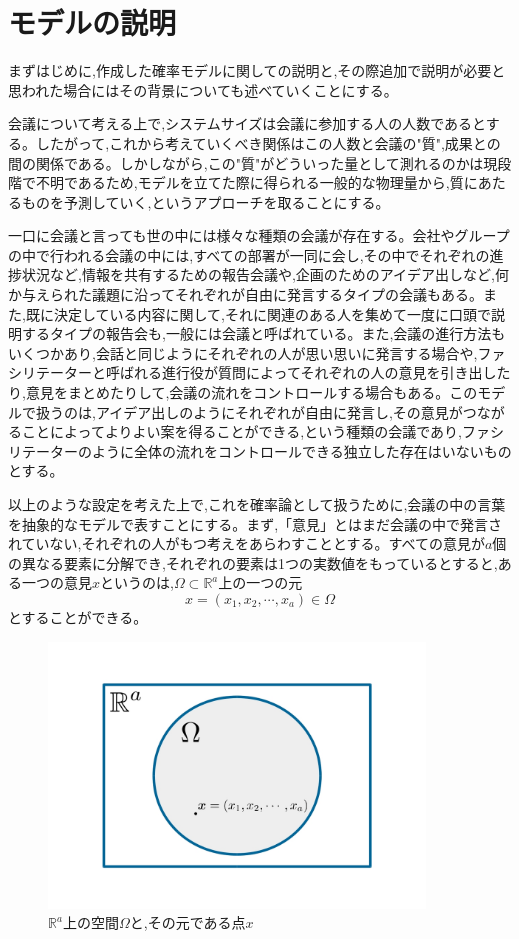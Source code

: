 \chapter{モデルの説明}

まずはじめに,作成した確率モデルに関しての説明と,その際追加で説明が必要と思われた場合にはその背景についても述べていくことにする。

会議について考える上で,システムサイズは会議に参加する人の人数であるとする。したがって,これから考えていくべき関係はこの人数と会議の"質",成果との間の関係である。しかしながら,この"質"がどういった量として測れるのかは現段階で不明であるため,モデルを立てた際に得られる一般的な物理量から,質にあたるものを予測していく,というアプローチを取ることにする。

一口に会議と言っても世の中には様々な種類の会議が存在する。会社やグループの中で行われる会議の中には,すべての部署が一同に会し,その中でそれぞれの進捗状況など,情報を共有するための報告会議や,企画のためのアイデア出しなど,何か与えられた議題に沿ってそれぞれが自由に発言するタイプの会議もある。また,既に決定している内容に関して,それに関連のある人を集めて一度に口頭で説明するタイプの報告会も,一般には会議と呼ばれている。また,会議の進行方法もいくつかあり,会話と同じようにそれぞれの人が思い思いに発言する場合や,ファシリテーターと呼ばれる進行役が質問によってそれぞれの人の意見を引き出したり,意見をまとめたりして,会議の流れをコントロールする場合もある。このモデルで扱うのは,アイデア出しのようにそれぞれが自由に発言し,その意見がつながることによってよりよい案を得ることができる,という種類の会議であり,ファシリテーターのように全体の流れをコントロールできる独立した存在はいないものとする。

以上のような設定を考えた上で,これを確率論として扱うために,会議の中の言葉を抽象的なモデルで表すことにする。まず,「意見」とはまだ会議の中で発言されていない,それぞれの人がもつ考えをあらわすこととする。すべての意見が$a$個の異なる要素に分解でき,それぞれの要素は1つの実数値をもっているとすると,ある一つの意見$x$というのは,$\Omega \subset \mathbb{R}^{a}$上の一つの元
\[x = (x_{1}, x_{2}, \cdots ,x_{a}) \in \Omega\]
とすることができる。
\begin{figure}[H]
    \begin{center}
        \includegraphics[width=10cm]{../img/ideaspace.jpg}
        \caption{$\mathbb{R}^{a}$上の空間$\Omega$と,その元である点$x$}
        \label{fig:f1}
    \end{center}
\end{figure}


